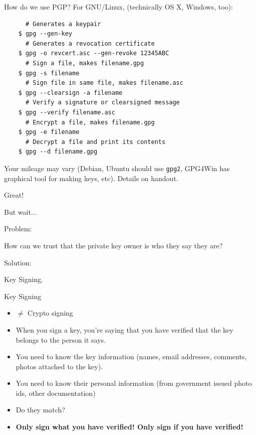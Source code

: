 \documentclass{beamer}
\begin{document}
\begin{frame}[fragile]{How do we use PGP?}
  For GNU/Linux, (technically OS X, Windows, too):
  
  \scriptsize
  \begin{lstlisting}
      # Generates a keypair
    $ gpg --gen-key
      # Generates a revocation certificate
    $ gpg -o revcert.asc --gen-revoke 12345ABC
      # Sign a file, makes filename.gpg
    $ gpg -s filename
      # Sign file in same file, makes filename.asc
    $ gpg --clearsign -a filename
      # Verify a signature or clearsigned message
    $ gpg --verify filename.asc
      # Encrypt a file, makes filename.gpg
    $ gpg -e filename
      # Decrypt a file and print its contents
    $ gpg --d filename.gpg
  \end{lstlisting}

  \normalsize
  Your mileage may vary (Debian, Ubuntu should use \texttt{gpg2},
  GPG4Win has graphical tool for making keys, etc).  Details on
  handout.
\end{frame}

\begin{frame}{}
  \centerline{\Huge Great!}
  
  \pause
  \centerline{\Large But wait...}
\end{frame}

\begin{frame}{}
  Problem:
  
  \begin{center}
    \Large How can we trust that the private key owner is who they
    say they are?
  \end{center}
\end{frame}

\begin{frame}{}
  Solution:

  \begin{center}
    \Huge Key Signing.
  \end{center}
\end{frame}

\begin{frame}{Key Signing}
  \begin{itemize}
  \item$\neq$ Crypto signing
  \item When you sign a key, you're saying that you have verified that
    the key belongs to the person it says.
  \item You need to know the key information (names, email addresses,
    comments, photos attached to the key).
  \item You need to know their personal information (from government
    issued photo ids, other documentation)
  \item Do they match?
  \item\textbf{Only sign what you have verified!  Only sign if you
      have verified!}
  \end{itemize}
\end{frame}
\end{document}
